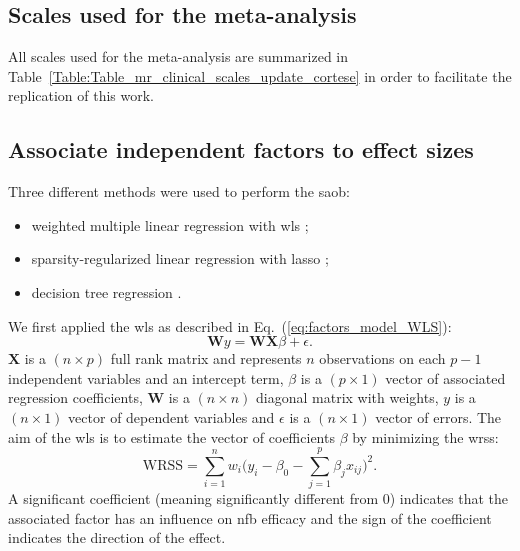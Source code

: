 \documentclass[12pt,a4paper,english]{article}
\begin{document}
\subsection{Scales used for the meta-analysis}

All scales used for the meta-analysis are summarized in Table~\ref{Table:Table_mr_clinical_scales_update_cortese} in order to facilitate the replication of this work.

\subsection{Associate independent factors to effect sizes}

Three different methods were used to perform the \gls{saob}:
\begin{itemize}
	\item weighted multiple linear regression with \gls{wls} \citep{Montgomery2012}; 
	\item sparsity-regularized linear regression with \gls{lasso} \citep{Tibshirani1996};
	\item decision tree regression \citep{Quinlan1986}.
\end{itemize}

We first applied the \gls{wls} as described in Eq.~(\ref{eq:factors_model_WLS}): 
\begin{equation}
\label{eq:factors_model_WLS}
\textbf{W}y = \textbf{WX}\beta + \epsilon.
\end{equation}
$\textbf{X}$ is a $(n \times p)$ full rank matrix and represents $n$ observations on each $p-1$ independent variables and an 
intercept term, $\beta$ is a $(p \times 1)$ vector of associated regression coefficients, $\textbf{W}$ is a $(n \times n)$ diagonal 
matrix with weights, $y$ is a $(n \times 1)$ vector of dependent variables and $\epsilon$ is a $(n \times 1)$ vector of errors.
The aim of the \gls{wls} is to estimate the vector of coefficients $\beta$ by minimizing the \gls{wrss}:
\begin{equation}
\label{eq:factors_WRSS}
\text{WRSS} = \sum_{i=1}^{n} w_i \Big(y_i - \beta_{0} - \sum_{j=1}^{p}\beta_{j}x_{ij}\Big)^2.
\end{equation}
A significant coefficient (meaning significantly different from 0) indicates that the associated factor has an 
influence on \gls{nfb} efficacy and the sign of the coefficient indicates the direction of the effect.
\end{document}
